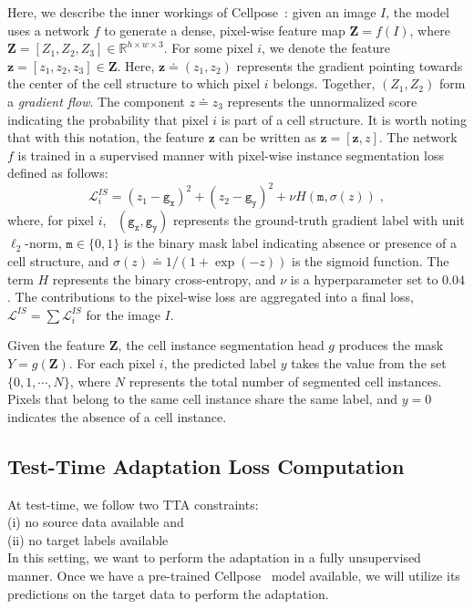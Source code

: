 Here, we describe the inner workings of Cellpose~\cite{stringer2021cellpose}: given an image $I$, the model uses a network $f$ to generate a dense, pixel-wise feature map $\bm{Z} = f(I)$, where $ \bm{Z} = [Z_1, Z_2, Z_3] \in \mathbb{R}^{h \times w \times 3}$. For some pixel $i$, we denote the feature $\mathbf{z} = [z_1, z_2, z_3] \in \bm{Z}$. Here, $\bm{z} \doteq (z_1, z_2)$ represents the gradient pointing towards the center of the cell structure to which pixel $i$ belongs. Together, $(Z_1,Z_2)$ form a \emph{gradient flow}. The component $z \doteq z_3$ represents the unnormalized score indicating the probability that pixel $i$ is part of a cell structure. It is worth noting that with this notation, the feature $\mathbf{z}$ can be written as $\mathbf{z} = [\bm{z}, z]$. The network $f$ is trained in a supervised manner with pixel-wise instance segmentation loss defined as follows:
\begin{equation}
 \mathcal{L}_i^{IS} = (z_1 - \mathtt{g_x})^2 + (z_2 - \mathtt{g_y})^2 + \nu H(\mathtt{m},\sigma(z))  \; ,
\end{equation}
where, for pixel $i$,  $(\mathtt{g_x}, \mathtt{g_y})$ represents the ground-truth gradient label with unit $\ell_2$-norm, $\mathtt{m} \in \{0, 1\}$ is the binary mask label indicating absence or presence of a cell structure, and $\sigma(z) \doteq 1/(1+\exp(-z))$ is the sigmoid function. The term $H$ represents the binary cross-entropy, and $\nu$ is a hyperparameter set to $0.04$. The contributions to the pixel-wise loss are aggregated into a final loss, $\mathcal{L}^{IS} = \sum \mathcal{L}_i^{IS}$ for the image $I$.


Given the feature $\bm{Z}$, the cell instance segmentation head $g$ produces the mask $Y = g(\bm{Z})$. For each pixel $i$, the predicted label $y$ takes the value from the set $\{0, 1, \cdots, N \}$, where $N$ represents the total number of segmented cell instances. Pixels that belong to the same cell instance share the same label, and $y=0$ indicates the absence of a cell instance. 


\subsection{Test-Time Adaptation Loss Computation}

At test-time, we follow two TTA constraints: \\
\indent (i) no source data available and \\
\indent (ii) no target labels available \\
In this setting, we want to perform the adaptation in a fully unsupervised manner. Once we have a pre-trained Cellpose~\cite{stringer2021cellpose} model available, we will utilize its predictions on the target data to perform the adaptation. 

